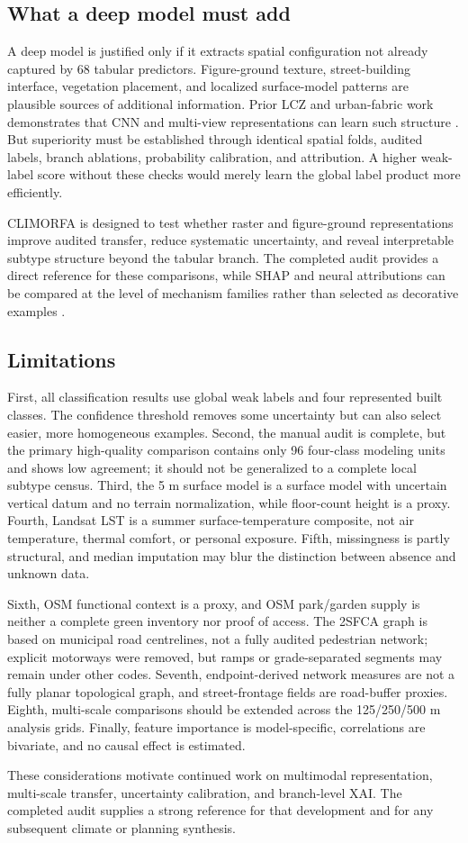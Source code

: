 \subsection{What a deep model must add}

A deep model is justified only if it extracts spatial configuration not already
captured by 68 tabular predictors. Figure-ground texture, street-building
interface, vegetation placement, and localized surface-model patterns are plausible
sources of additional information. Prior LCZ and urban-fabric work demonstrates
that CNN and multi-view representations can learn such structure
\citep{qiu2020MultilevFeature,yoo2020ImprovinLocal,
fang2024UrbanclaDeep}. But superiority must be established through identical
spatial folds, audited labels, branch ablations, probability calibration, and
attribution. A higher weak-label score without these checks would merely learn
the global label product more efficiently.

CLIMORFA is designed to test whether raster and figure-ground representations
improve audited transfer, reduce systematic uncertainty, and reveal interpretable
subtype structure beyond the tabular branch. The completed audit provides a
direct reference for these comparisons, while SHAP and neural attributions can
be compared at the level of mechanism families rather than selected as
decorative examples
\citep{xu2025CharacteThermal,han2025PerspectUndersta,
liu2026UnderstaNonlinea}.

\subsection{Limitations}

First, all classification results use global weak labels and four represented
built classes. The confidence threshold removes some uncertainty but can also
select easier, more homogeneous examples. Second, the manual audit is complete,
but the primary high-quality comparison contains only 96 four-class modeling
units and shows low agreement; it should not be generalized to a complete local
subtype census.
Third, the 5 m surface model is a surface model with uncertain vertical datum and no
terrain normalization, while floor-count height is a proxy. Fourth, Landsat LST
is a summer surface-temperature composite, not air temperature, thermal comfort,
or personal exposure. Fifth, missingness is partly structural, and median
imputation may blur the distinction between absence and unknown data.

Sixth, OSM functional context is a proxy, and OSM park/garden supply is neither
a complete green inventory nor proof of access. The 2SFCA graph is
based on municipal road centrelines, not a fully audited pedestrian network;
explicit motorways were removed, but ramps or grade-separated segments may
remain under other codes. Seventh, endpoint-derived network measures are not a
fully planar topological graph, and street-frontage fields are road-buffer
proxies. Eighth, multi-scale comparisons should be extended across the
125/250/500 m analysis grids. Finally, feature importance is model-specific,
correlations are bivariate, and no causal effect is estimated.

These considerations motivate continued work on multimodal representation,
multi-scale transfer, uncertainty calibration, and branch-level XAI. The
completed audit supplies a strong reference for that development and for any
subsequent climate or planning synthesis.

